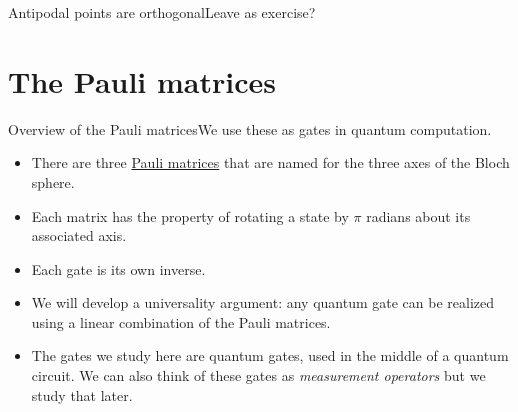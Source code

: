 \begin{frame}{Antipodal points are orthogonal}{Leave as exercise?}
\end{frame}

\section{The Pauli matrices}

\begin{frame}{Overview of the Pauli matrices}{We use these as gates in quantum computation.}

\begin{itemize}
    \item There are three \href{https://en.wikipedia.org/wiki/Pauli_matrices}{Pauli matrices} that are named for the three axes of the Bloch sphere.
    \item Each matrix has the property of rotating a state by $\pi$ radians about its associated axis.
    \item Each gate is its own inverse.
    \item We will develop a universality argument:  any quantum gate can be realized using a linear combination of the Pauli matrices.
    \item The gates we study here are quantum gates, used in the middle of a quantum circuit.  We can also think of these gates as \emph{measurement operators} but we study that later.
\end{itemize}
    
\end{frame}

